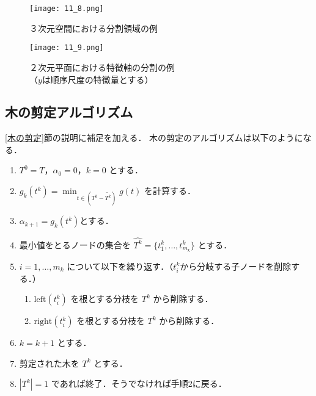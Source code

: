 \documentclass[dvipdfmx]{jreport}
\begin{document}
\begin{figure}[h]
    \centering
    \begin{minipage}[b]{0.49\columnwidth}
        \centering
        \texttt{[image: 11\_8.png]}
        \caption{３次元空間における分割領域の例}\label{fig:3}
    \end{minipage}
    \centering
    \begin{minipage}[b]{0.49\columnwidth}
        \centering
        \texttt{[image: 11\_9.png]}
        \caption{２次元平面における特徴軸の分割の例\\\hspace{25pt}（$y$は順序尺度の特徴量とする）}\label{fig:4}
    \end{minipage}
\end{figure}

\subsection{木の剪定アルゴリズム}
\ref{木の剪定}節の説明に補足を加える．
木の剪定のアルゴリズムは以下のようになる．
\begin{tcolorbox}[title=\textbf{木の剪定アルゴリズム}]
    \begin{enumerate}
        \item $T^0 = T$，$\alpha_0=0$，$k=0$ とする．
        \item $g_k(t^k) = \min_{t \in (T^k - \tilde{T^k})}g(t)$ を計算する．
        \item $\alpha_{k+1} = g_k(t^k)$とする．
        \item 最小値をとるノードの集合を $\hat{T^k} = \{t^k_1, \ldots, t^k_{m_k}\}$ とする．
        \item $i = 1, \ldots, m_k$ について以下を繰り返す．（$t^k_i$から分岐する子ノードを削除する．）
        \begin{enumerate}
            \item $\text{left}(t^k_i)$ を根とする分枝を $T^k$ から削除する．
            \item $\text{right}(t^k_i)$ を根とする分枝を $T^k$ から削除する．
        \end{enumerate}
        \item $k = k + 1$ とする．
        \item 剪定された木を $T^k$ とする．
        \item $|T^k| = 1$ であれば終了．そうでなければ手順2に戻る．
    \end{enumerate}
\end{tcolorbox}
\end{document}

